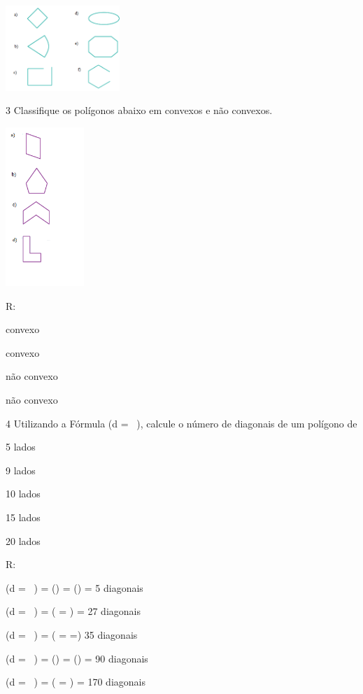 {\includegraphics[width=1.7in,height=1.26763in]{./imgSAEB_8_MAT/media/image7.png}


\num{3} Classifique os polígonos abaixo em convexos e não convexos.

\includegraphics[width=1.16236in,height=2.36667in]{./imgSAEB_8_MAT/media/image8.png}

R:
\item convexo
\item convexo
\item não convexo
\item não convexo

\num{4} Utilizando a Fórmula (d = \ ), calcule o número
de diagonais de um polígono de
\item 5 lados
\item 9 lados
\item 10 lados
\item 15 lados
\item 20 lados

R:
\item (d = \ ) = () =
() = 5 diagonais
\item (d = \ ) = ( = ) =
27 diagonais
\item (d = \ ) =
( =  =) 35 diagonais
\item (d = \ ) = () =
() = 90 diagonais
\item (d = \ ) =
( = ) = 170 diagonais

}
